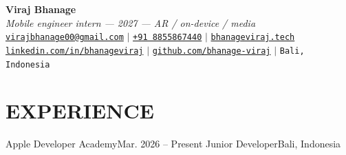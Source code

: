 


\begin{center}
    \textbf{\Huge Viraj Bhanage} \\ \vspace{4pt}
    {\small\textit{Mobile engineer intern --- 2027 --- AR / on-device / media}} \\ \vspace{4pt}
    \small
    \faEnvelope \hspace{2pt} \href{mailto:virajbhanage00@gmail.com}{\texttt{virajbhanage00@gmail.com}} \hspace{1pt} $|$
    \hspace{1pt} \faPhone \hspace{2pt} \href{tel:+918855867440}{\texttt{+91 8855867440}} \hspace{1pt} $|$
    \hspace{1pt} \href{https://www.bhanageviraj.tech}{\texttt{bhanageviraj.tech}} \\
    \faLinkedin \hspace{2pt} \href{https://www.linkedin.com/in/bhanageviraj/}{\texttt{linkedin.com/in/bhanageviraj}} \hspace{1pt} $|$
    \hspace{1pt} \faGithub \hspace{2pt} \href{https://github.com/bhanage-viraj}{\texttt{github.com/bhanage-viraj}} \hspace{1pt} $|$
    \hspace{1pt} \faMapMarker* \hspace{2pt}\texttt{Bali, Indonesia}
\end{center}

\section{EXPERIENCE}
  \resumeSubHeadingListStart
    \resumeSubheading
      {Apple Developer Academy}{Mar. 2026 -- Present}
      {Junior Developer}{Bali, Indonesia}
      \resumeItemListStart
      \resumeItemListEnd
  \resumeSubHeadingListEnd

